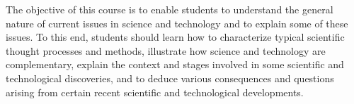 {The objective of this course is to enable students to understand the general nature of current issues in 
science and technology and to explain some of these issues. To this end, students should learn how to 
characterize typical scientific thought processes and methods, illustrate how science and technology are 
complementary, explain the context and stages involved in some scientific and technological 
discoveries, and to deduce various consequences and questions arising from certain recent scientific and 
technological developments. }
